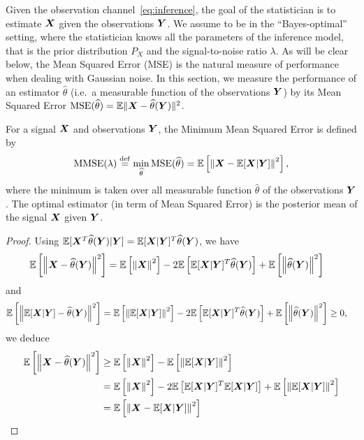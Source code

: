 \documentclass[12pt,nocut]{article}
\begin{document}
Given the observation channel~\eqref{eq:inference}, the goal of the statistician is to estimate ${\boldsymbol X}$ given the observations ${\boldsymbol Y}$. We assume to be in the ``Bayes-optimal'' setting, where the statistician knows all the parameters of the inference model, that is the prior distribution $P_X$ and the signal-to-noise ratio $\lambda$. 
As will be clear below, the Mean Squared Error (MSE) is the natural measure of performance when dealing with Gaussian noise. In this section, we measure the performance of an estimator $\widehat{\theta}$ (i.e.\ a measurable function of the observations ${\boldsymbol Y}$) by its Mean Squared Error ${{\rm MSE}}(\widehat{\theta}) = \mathbb{E} \| {\boldsymbol X} - \widehat{\theta}({\boldsymbol Y}) \|^2$.
\begin{definition}\label{def:MMSE}
For a signal ${\boldsymbol X}$ and observations ${\boldsymbol Y}$, the Minimum Mean Squared Error is defined by
$$
{{\rm MMSE}}(\lambda) \overset{{\rm def}}{=} \min_{\widehat{\theta}} {{\rm MSE}}(\widehat{\theta})= \mathbb{E} \left[ \left\| {\boldsymbol X} - \mathbb{E}[{\boldsymbol X}|{\boldsymbol Y}] \right\|^2 \right],
$$
where the minimum is taken over all measurable function $\widehat{\theta}$ of the observations ${\boldsymbol Y}$. 
The optimal estimator (in term of Mean Squared Error) is the posterior mean of the signal ${\boldsymbol X}$ given ${\boldsymbol Y}$.
\end{definition}
\begin{proof}
Using $\mathbb{E}[{\boldsymbol X}^T\widehat{\theta}({\boldsymbol Y})|{\boldsymbol Y}]  = \mathbb{E}[{\boldsymbol X}|{\boldsymbol Y}]^T \widehat{\theta}({\boldsymbol Y})$, we have
\begin{align*}
\mathbb{E} \left[ \left\| {\boldsymbol X} -  \widehat{\theta}({\boldsymbol Y})\right\|^2 \right] & = \mathbb{E}\left[ \left\| {\boldsymbol X}\right\|^2\right] - 2 \mathbb{E} \left[ \mathbb{E}[{\boldsymbol X}|{\boldsymbol Y}]^T \widehat{\theta}({\boldsymbol Y})\right] + \mathbb{E}\left[ \left\| \widehat{\theta}({\boldsymbol Y})\right\|^2\right]
\end{align*}
and 
\begin{align*}
\mathbb{E} \left[ \left\| \mathbb{E}[{\boldsymbol X}|{\boldsymbol Y}] -  \widehat{\theta}({\boldsymbol Y})\right\|^2 \right] & = \mathbb{E}\left[ \left\| \mathbb{E}[{\boldsymbol X}|{\boldsymbol Y}]\right\|^2\right] - 2 \mathbb{E} \left[ \mathbb{E}[{\boldsymbol X}|{\boldsymbol Y}]^T \widehat{\theta}({\boldsymbol Y})\right] + \mathbb{E}\left[ \left\| \widehat{\theta}({\boldsymbol Y})\right\|^2\right]\geq 0,
\end{align*}
we deduce
\begin{align*}
\mathbb{E} \left[ \left\| {\boldsymbol X} -  \widehat{\theta}({\boldsymbol Y})\right\|^2 \right] & \geq \mathbb{E}\left[ \left\| {\boldsymbol X}\right\|^2\right] - \mathbb{E}\left[ \left\| \mathbb{E}[{\boldsymbol X}|{\boldsymbol Y}]\right\|^2\right]\\
& = \mathbb{E}\left[ \left\| {\boldsymbol X}\right\|^2\right] -2\mathbb{E} \left[ \mathbb{E}[{\boldsymbol X}|{\boldsymbol Y}]^T\mathbb{E}[{\boldsymbol X}|{\boldsymbol Y}] \right] + \mathbb{E}\left[ \left\| \mathbb{E}[{\boldsymbol X}|{\boldsymbol Y}]\right\|^2\right]\\
& = \mathbb{E} \left[ \left\| {\boldsymbol X} - \mathbb{E}[{\boldsymbol X}|{\boldsymbol Y}] \right\|^2 \right]
\end{align*}
\end{proof}
\end{document}
